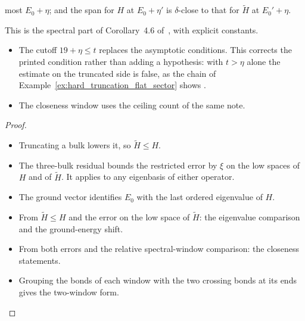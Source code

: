 \begin{lemma}
\begin{itemize}
              most $E_0+\eta$; and the span for $H$ at $E_0+\eta'$ is
              $\delta$-close to that for $\tilde H$ at $E_0'+\eta$.
    \end{itemize}
    This is the spectral part of Corollary~4.6 of~\cite{Arad2016RigorousRG},
    with explicit constants.
    \begin{itemize}
        \item The cutoff $19+\eta\le t$ replaces the asymptotic conditions.
              This corrects the printed condition rather than adding a
              hypothesis: with $t>\eta$ alone the estimate on the truncated
              side is false, as the chain of
              Example~\ref{ex:hard_truncation_flat_sector} shows
              \cite{gap:alvv16_hard_truncation_windows}.
        \item The closeness window uses the ceiling count of the same note.
    \end{itemize}
\end{lemma}
\begin{proof}\leanok
    \begin{itemize}
        \item Truncating a bulk lowers it, so $\tilde H\le H$.
        \item The three-bulk residual bounds the restricted error by $\xi$ on
              the low spaces of $H$ and of $\tilde H$. It applies to any
              eigenbasis of either operator.
        \item The ground vector identifies $E_0$ with the last ordered
              eigenvalue of $H$.
        \item From $\tilde H\le H$ and the error on the low space of
              $\tilde H$: the eigenvalue comparison and the ground-energy
              shift.
        \item From both errors and the relative spectral-window comparison:
              the closeness statements.
        \item Grouping the bonds of each window with the two crossing bonds
              at its ends gives the two-window form.
    \end{itemize}
\end{proof}

